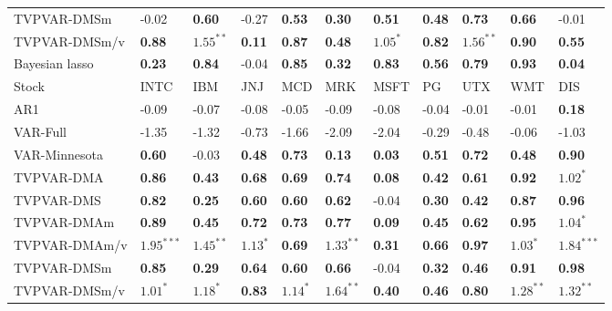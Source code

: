 \begin{table}[h!]
{\begin{center}
\begin{tabularx}{1\textwidth}{@{}X@{\hspace{0.15cm}}l@{\hspace{0.15cm}}l@{\hspace{0.15cm}}l@{\hspace{0.15cm}}l@{\hspace{0.15cm}}l@{\hspace{0.15cm}}l@{\hspace{0.15cm}}l@{\hspace{0.15cm}}l@{\hspace{0.15cm}}l@{\hspace{0.15cm}}l@{}}
 TVPVAR-DMSm  & -0.02	 & \textbf{0.60}	 & -0.27	 & \textbf{0.53}	 & \textbf{0.30}	 & \textbf{0.51}	 & \textbf{0.48}	 & \textbf{0.73}	 & \textbf{0.66}	 & -0.01	\\
 TVPVAR-DMSm/v  & \textbf{0.88}	 & $\mathbf{1.55^{**}}$	 & \textbf{0.11}	 & \textbf{0.87}	 & \textbf{0.48}	 & $\mathbf{1.05^{*}}$	 & \textbf{0.82}	 & $\mathbf{1.56^{**}}$	 & \textbf{0.90}	 & \textbf{0.55}	\\
\midrule
 Bayesian lasso  & \textbf{0.23}	 & \textbf{0.84}	 & -0.04	 & \textbf{0.85}	 & \textbf{0.32}	 & \textbf{0.83}	 & \textbf{0.56}	 & \textbf{0.79}	 & \textbf{0.93}	 & \textbf{0.04}	\\
\midrule
\midrule
 Stock  & INTC	 & IBM	 & JNJ	 & MCD	 & MRK	 & MSFT	 & PG	 & UTX	 & WMT	 & DIS	\\
\midrule
 AR1  & -0.09	 & -0.07	 & -0.08	 & -0.05	 & -0.09	 & -0.08	 & -0.04	 & -0.01	 & -0.01	 & \textbf{0.18}	\\
 VAR-Full  & -1.35	 & -1.32	 & -0.73	 & -1.66	 & -2.09	 & -2.04	 & -0.29	 & -0.48	 & -0.06	 & -1.03	\\
 VAR-Minnesota  & \textbf{0.60}	 & -0.03	 & \textbf{0.48}	 & \textbf{0.73}	 & \textbf{0.13}	 & \textbf{0.03}	 & \textbf{0.51}	 & \textbf{0.72}	 & \textbf{0.48}	 & \textbf{0.90}	\\
\midrule
 TVPVAR-DMA  & \textbf{0.86}	 & \textbf{0.43}	 & \textbf{0.68}	 & \textbf{0.69}	 & \textbf{0.74}	 & \textbf{0.08}	 & \textbf{0.42}	 & \textbf{0.61}	 & \textbf{0.92}	 & $\mathbf{1.02^{*}}$	\\
 TVPVAR-DMS  & \textbf{0.82}	 & \textbf{0.25}	 & \textbf{0.60}	 & \textbf{0.60}	 & \textbf{0.62}	 & -0.04	 & \textbf{0.30}	 & \textbf{0.42}	 & \textbf{0.87}	 & \textbf{0.96}	\\
\midrule
 TVPVAR-DMAm  & \textbf{0.89}	 & \textbf{0.45}	 & \textbf{0.72}	 & \textbf{0.73}	 & \textbf{0.77}	 & \textbf{0.09}	 & \textbf{0.45}	 & \textbf{0.62}	 & \textbf{0.95}	 & $\mathbf{1.04^{*}}$	\\
 TVPVAR-DMAm/v  & $\mathbf{1.95^{***}}$	 & $\mathbf{1.45^{**}}$	 & $\mathbf{1.13^{*}}$	 & \textbf{0.69}	 & $\mathbf{1.33^{**}}$	 & \textbf{0.31}	 & \textbf{0.66}	 & \textbf{0.97}	 & $\mathbf{1.03^{*}}$	 & $\mathbf{1.84^{***}}$	\\
 TVPVAR-DMSm  & \textbf{0.85}	 & \textbf{0.29}	 & \textbf{0.64}	 & \textbf{0.60}	 & \textbf{0.66}	 & -0.04	 & \textbf{0.32}	 & \textbf{0.46}	 & \textbf{0.91}	 & \textbf{0.98}	\\
 TVPVAR-DMSm/v  & $\mathbf{1.01^{*}}$	 & $\mathbf{1.18^{*}}$	 & \textbf{0.83}	 & $\mathbf{1.14^{*}}$	 & $\mathbf{1.64^{**}}$	 & \textbf{0.40}	 & \textbf{0.46}	 & \textbf{0.80}	 & $\mathbf{1.28^{**}}$	 & $\mathbf{1.32^{**}}$	\\

\end{tabularx}
\end{center}}
\end{table}
